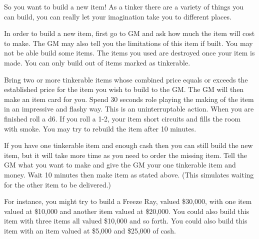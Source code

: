 \documentclass[green]{LRSguildcamp1}
\begin{document}
\name{\gTinkering{}}

So you want to build a new item! As a tinker there are a variety of things you can build, you can really let your imagination take you to different places. 

In order to build a new item, first go to GM and ask how much the item will cost to make. The GM may also tell you the limitations of this item if built. You may not be able build some items. The items you used are destroyed once your item is made. You can only build out of items marked as tinkerable.

Bring two or more tinkerable items whose combined price equals or exceeds the established price for the item you wish to build to the GM. 
The GM will then make an item card for you. Spend 30 seconds role playing the making of the item in an impressive and flashy way. This is an uninterruptable action. When you are finished roll a d6.  If you roll a 1-2, your item short circuits and fills the room with smoke. You may try to rebuild the item after 10 minutes. 

If you have one tinkerable item and enough cash then you can still build the new item, but it will take more time as you need to order the missing item. Tell the GM what you want to make and give the GM your one tinkerable item and money. Wait 10 minutes then make item as stated above. (This simulates waiting for the other item to be delivered.) 

For instance, you might try to build a Freeze Ray, valued \$30,000, with one item valued at \$10,000 and another item valued at \$20,000. You could also build this item with three items all valued \$10,000 and so forth. You could also build this item with an item valued at \$5,000 and \$25,000 of cash. 

\end{document}

